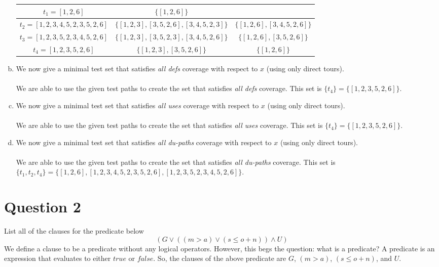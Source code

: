 \documentclass{article}
\begin{document}
\begin{enumerate}[(a)]
\begin{center}
\begin{tabular}{|c||c|c|}
				\hline
				$ t_1 = [ 1, 2, 6 ]$ & $ \{ [1, 2, 6] \} $ & \\
				\hline
				$ t_2 = [ 1, 2, 3, 4, 5, 2, 3, 5, 2, 6 ] $ & %
					$ \{ [1, 2, 3], [3, 5, 2, 6], [3, 4, 5, 2, 3] \} $ & %
					$ \{ [1, 2, 6], [3, 4, 5, 2, 6] \} $ \\ %
				\hline
				$ t_3 = [ 1, 2, 3, 5, 2, 3, 4, 5, 2, 6 ] $ & %
					$ \{ [1, 2, 3], [3, 5, 2, 3], [3, 4, 5, 2, 6] \} $ & %
					$ \{ [1, 2, 6], [3, 5, 2, 6] \} $ \\ %
				\hline
				$ t_4 = [ 1, 2, 3, 5, 2, 6 ] $ & %
					$ \{ [1, 2, 3], [3, 5, 2, 6] \} $ & %
					$ \{ [1, 2, 6] \} $ \\ %
				\hline
			\end{tabular}
		\end{center}
	\item We now give a minimal test set that satisfies \textit{all defs} coverage with respect to $x$ (using only direct tours). \\\\
		We are able to use the given test paths to create the set that satisfies \textit{all defs} coverage. This set is $ \{ t_4 \} = \{ [1, 2, 3, 5, 2, 6] \} $.
	\item We now give a minimal test set that satisfies \textit{ all uses} coverage with respect to $x$ (using only direct tours). \\\\
		We are able to use the given test paths to create the set that satisfies \textit{all uses} coverage. This set is $ \{ t_4 \} = \{ [1, 2, 3, 5, 2, 6] \} $.
	\item We now give a minimal test set that satisfies \textit{all du-paths} coverage with respect to $x$ (using only direct tours). \\\\
		We are able to use the given test paths to create the set that satisfies \textit{all du-paths} coverage. This set is $ \{ t_1, t_2, t_4 \} = \{ [1, 2, 6], [1, 2, 3, 4, 5, 2, 3, 5, 2, 6], [1, 2, 3, 5, 2, 3, 4, 5, 2, 6] \} $.
\end{enumerate}

\newpage
\section*{Question 2}
List all of the clauses for the predicate below
$$ ( G \lor ((m > a) \lor (s \leq o + n)) \land U ) $$
We define a clause to be a predicate without any logical operators. However, this begs the question: what is a predicate? A predicate is an expression that evaluates to either $true$ or $false$. So, the clauses of the above predicate are $ G$, $(m > a)$, $(s \leq o + n)$, and $U$.
\newpage
\end{document}
